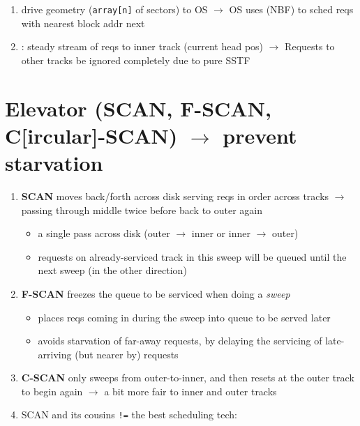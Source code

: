 \begin{enumerate}
  \item drive geometry (\texttt{array[n]} of sectors)  to OS $\to$ OS uses  (NBF) to sched reqs with nearest block addr next
  \item {}: steady stream of reqs to inner track (current head pos) $\to$ Requests to other tracks be ignored completely due to pure SSTF
\end{enumerate}
\section*{Elevator (SCAN, F-SCAN, C[ircular]-SCAN) $\to$ prevent starvation}
\begin{enumerate}
\item \textbf{SCAN} moves back/forth across disk serving reqs in order across tracks $\to$ passing through middle twice before back to outer again
  \begin{itemize}[leftmargin=.1em]
  \item {} a single pass across disk (outer $\to$ inner or inner $\to$ outer)
  \item requests on already-serviced track in this sweep will be queued until the next sweep (in the other direction)
  \end{itemize}
\item \textbf{F-SCAN} freezes the queue to be serviced when doing a \emph{sweep}
    \begin{itemize}[leftmargin=.1em]
  \item places reqs coming in during the sweep into queue to be served later
  \item avoids starvation of far-away requests, by delaying the servicing of late-arriving (but nearer by) requests
  \end{itemize}
\item \textbf{C-SCAN} only sweeps from outer-to-inner, and then resets at the outer track to begin again $\to$ a bit more fair to inner and outer tracks
\item[] SCAN and its cousins \texttt{!=} the best scheduling tech:
\end{enumerate}
